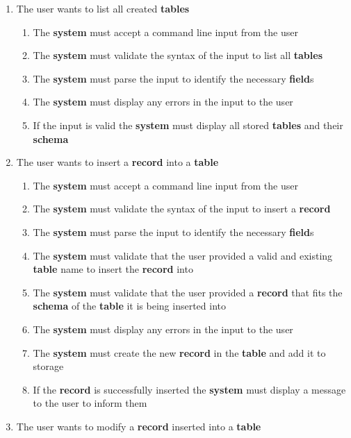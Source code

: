 \documentclass[12pt, titlepage]{article}
\begin{document}
\begin{enumerate}[{BE}1.]
\begin{enumerate}[{FR}1.]
    \end{enumerate}
    \item The user wants to list all created \textbf{tables}
    \begin{enumerate}[{FR}1.]
        \item The \textbf{system} must accept a command line input from the user
        \item The \textbf{system} must validate the syntax of the input to list all \textbf{tables}
        \item The \textbf{system} must parse the input to identify the necessary \textbf{field}s
        \item The \textbf{system} must display any errors in the input to the user
        \item If the input is valid the \textbf{system} must display all stored \textbf{tables} and their \textbf{schema}
    \end{enumerate}
    \item The user wants to insert a \textbf{record} into a \textbf{table}
    \begin{enumerate}[{FR}1.]
        \item The \textbf{system} must accept a command line input from the user
        \item The \textbf{system} must validate the syntax of the input to insert a \textbf{record}
        \item The \textbf{system} must parse the input to identify the necessary \textbf{field}s
        \item The \textbf{system} must validate that the user provided a valid and existing \textbf{table} name to insert the \textbf{record} into
        \item The \textbf{system} must validate that the user provided a \textbf{record} that fits the \textbf{schema} of the \textbf{table} it is being inserted into
        \item The \textbf{system} must display any errors in the input to the user
        \item The \textbf{system} must create the new \textbf{record} in the \textbf{table} and add it to storage
        \item If the \textbf{record} is successfully inserted the \textbf{system} must display a message to the user to inform them
    \end{enumerate}
    \item The user wants to modify a \textbf{record} inserted into a \textbf{table}
    \begin{enumerate}[{FR}1.]

\end{enumerate}
\end{enumerate}
\end{document}

